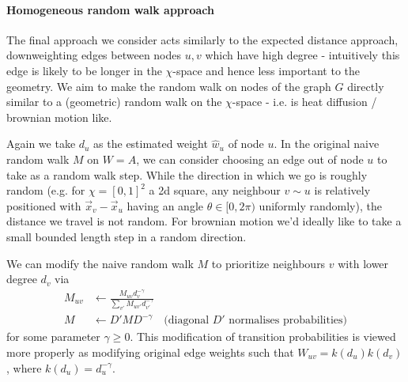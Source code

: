 

\paragraph{Homogeneous random walk approach}
The final approach we consider acts similarly to the expected distance approach, downweighting edges between nodes $u, v$ which have high degree - intuitively this edge is likely to be longer in the $\chi$-space and hence less important to the geometry. We aim to make the random walk on nodes of the graph $G$ directly similar to a (geometric) random walk on the $\chi$-space - i.e. is heat diffusion / brownian motion like.

Again we take $d_u$ as the estimated weight $\hat{w}_u$ of node $u$. In the original naive random walk $M$ on $W = A$, we can consider choosing an edge out of node $u$ to take as a random walk step. While the direction in which we go is roughly random (e.g. for $\chi=[0,1]^2$ a 2d square, any neighbour $v \sim u$ is relatively positioned with $\vec{x}_v - \vec{x}_u$ having an angle $\theta \in [0, 2\pi)$ uniformly randomly), the distance we travel is not random. For brownian motion we'd ideally like to take a small bounded length step in a random direction. 

We can modify the naive random walk $M$ to prioritize neighbours $v$ with lower degree $d_v$ via
\begin{align*}
  M_{uv} &\gets \frac{M_{uv} {d_v^{-\gamma}}}{\sum_{v'} M_{uv'} {d_{v'}^{-\gamma}}}
  \\
  M &\gets D' M D^{-\gamma} \quad \text{(diagonal $D'$ normalises probabilities)}
\end{align*}
for some parameter $\gamma \geq 0$. This modification of transition probabilities is viewed more properly as modifying original edge weights such that $W_{uv} = k(d_u) k(d_v)$, where $k(d_u) = d_u^{-\gamma}$.

